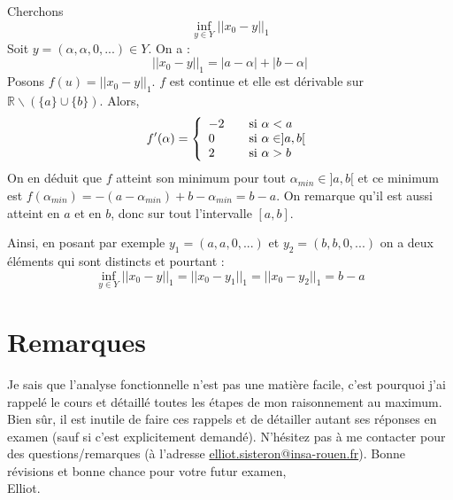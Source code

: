 \documentclass[a4paper,11pt]{article}
\theoremstyle{plain}
\theoremstyle{definition}
\begin{document}
Cherchons 
\[
\inf_{y \in Y} ||x_0 - y||_1
\]
Soit $y = (\alpha, \alpha, 0, ...) \in Y$.
On a :
\[
	||x_0 - y||_1 = |a - \alpha| + |b - \alpha|
\]
Posons $f(u) = ||x_0 - y||_1$.
$f$ est continue et elle est dérivable sur $\mathbb{R}\backslash\left(\{a\}\cup\{b\}\right)$.
Alors,
\[ f'(\alpha) = \left\{ 
  \begin{array}{l l l}
    -2 & \quad \text{si $\alpha < a$}\\
    0 & \quad \text{si $\alpha \in ]a,b[$}\\
    2 & \quad \text{si $\alpha > b$}
  \end{array} \right.\]
On en déduit que $f$ atteint son minimum pour tout $\alpha_{min} \in ]a,b[$ et ce minimum est $f(\alpha_{min}) = -(a - \alpha_{min}) + b - \alpha_{min} = b - a$.
On remarque qu'il est aussi atteint en $a$ et en $b$, donc sur tout l'intervalle $[a,b]$.

Ainsi, en posant par exemple $y_1 = (a, a, 0, ...)$ et $y_2 = (b, b, 0, ...)$ on a deux éléments qui sont distincts et pourtant :
\[
	\inf_{y \in Y} ||x_0 - y||_1  = ||x_0 - y_1||_1 = ||x_0 - y_2 ||_1 = b - a
\]


\section*{Remarques}
Je sais que l'analyse fonctionnelle n'est pas une matière facile, c'est pourquoi j'ai rappelé le cours et détaillé toutes les étapes de mon raisonnement au maximum.
Bien sûr, il est inutile de faire ces rappels et de détailler autant ses réponses en examen (sauf si c'est explicitement demandé).
N'hésitez pas à me contacter pour des questions/remarques (à l'adresse \href{mailto:elliot.sisteron@insa-rouen.fr}{elliot.sisteron@insa-rouen.fr}).
Bonne révisions et bonne chance pour votre futur examen,\\

Elliot.
\end{document}
